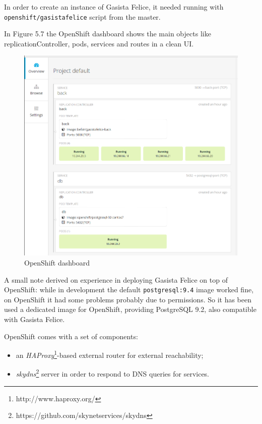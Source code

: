 In order to create an instance of Gasista Felice, it needed running with \texttt{openshift/gasistafelice} script from the master.

In Figure 5.7 the OpenShift dashboard shows the main objects like replicationController, pods, services and routes in a clean UI.

\begin{figure}[htbp]
\centering
\includegraphics{media/ch5-openshift.png}
\caption{OpenShift dashboard}
\end{figure}

A small note derived on experience in deploying Gasista Felice on top of OpenShift:  while in development the default \texttt{postgresql:9.4} image worked fine, on OpenShift it had some problems probably due to permissions. So it has been used a dedicated image for OpenShift, providing PostgreSQL 9.2, also compatible with Gasista Felice.

OpenShift comes with a set of components:

\begin{itemize}
\item an \textit{HAProxy}\footnote{http://www.haproxy.org/}-based external router for external reachability;
\item \textit{skydns}\footnote{https://github.com/skynetservices/skydns} server in order to respond to DNS queries for services.
\end{itemize}

